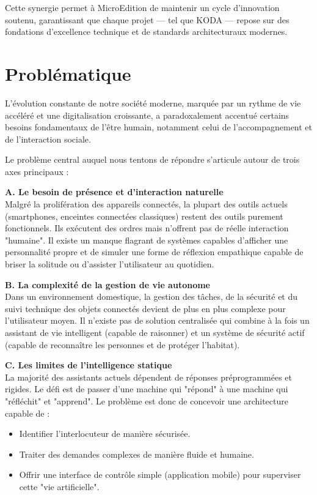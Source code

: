 \documentclass[a4paper,12pt]{report}
\newcommand{\sectiontitle}[1]{\needspace{4\baselineskip}\section{#1}}
\begin{document}
	Cette synergie permet à MicroEdition de maintenir un cycle d'innovation soutenu, garantissant que chaque projet — tel que KODA — repose sur des fondations d'excellence technique et de standards architecturaux modernes.
	
	\sectiontitle{Problématique}
	
	L’évolution constante de notre société moderne, marquée par un rythme de vie accéléré et une digitalisation croissante, a paradoxalement accentué certains besoins fondamentaux de l’être humain, notamment celui de l'accompagnement et de l'interaction sociale.
	
	Le problème central auquel nous tentons de répondre s'articule autour de trois axes principaux :
	
	\textbf{A. Le besoin de présence et d'interaction naturelle}\\
	Malgré la prolifération des appareils connectés, la plupart des outils actuels (smartphones, enceintes connectées classiques) restent des outils purement fonctionnels. Ils exécutent des ordres mais n’offrent pas de réelle interaction "humaine". Il existe un manque flagrant de systèmes capables d'afficher une personnalité propre et de simuler une forme de réflexion empathique capable de briser la solitude ou d'assister l'utilisateur au quotidien.
	
	\textbf{B. La complexité de la gestion de vie autonome}\\
	Dans un environnement domestique, la gestion des tâches, de la sécurité et du suivi technique des objets connectés devient de plus en plus complexe pour l'utilisateur moyen. Il n'existe pas de solution centralisée qui combine à la fois un assistant de vie intelligent (capable de raisonner) et un système de sécurité actif (capable de reconnaître les personnes et de protéger l'habitat).
	
	\textbf{C. Les limites de l'intelligence statique}\\
	La majorité des assistants actuels dépendent de réponses préprogrammées et rigides. Le défi est de passer d'une machine qui "répond" à une machine qui "réfléchit" et "apprend". Le problème est donc de concevoir une architecture capable de :
	\begin{itemize}
		\item Identifier l'interlocuteur de manière sécurisée.
		\item Traiter des demandes complexes de manière fluide et humaine.
		\item Offrir une interface de contrôle simple (application mobile) pour superviser cette "vie artificielle".
	\end{itemize}
	
\end{document}
